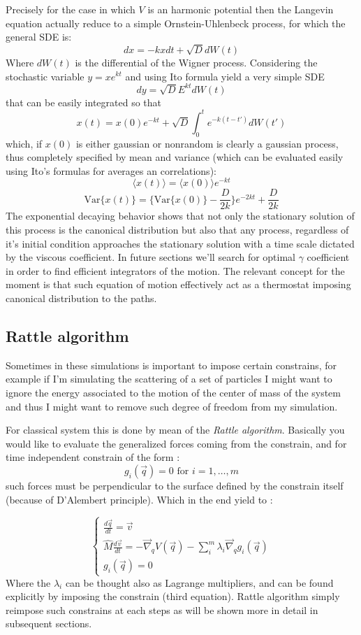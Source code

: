 \documentclass[10pt,a4paper]{article}
\begin{document}
Precisely for the case in which $V$ is an harmonic potential then the Langevin equation actually reduce to a simple Ornstein-Uhlenbeck process, for which the general SDE is:
\[dx = -kxdt+\sqrt{D} dW(t) \] 
Where $dW(t)$ is the differential of the Wigner process.
Considering the stochastic variable $y=xe^{kt}$ and using Ito formula yield a very simple SDE 
\[dy = \sqrt{D} E^{kt} dW(t) \] 
that can be easily integrated so that
\[x(t) = x(0)e^{-kt}+\sqrt{D} \int_0^t e^{-k(t-t')}dW(t') \]
which, if $x(0)$ is either gaussian or nonrandom is clearly a gaussian process, thus completely specified by mean and variance (which can be evaluated easily using Ito's formulas for averages an correlations):
\[\langle x(t)\rangle =  \langle x(0)\rangle e^{-kt} \]
\[ \text{Var} \{x(t) \}= \{\text{Var}\{x(0)\}  -\frac{D}{2k} \}e^{-2kt} +\frac{D}{2k} \]
The exponential decaying behavior shows that not only the stationary solution of this process is the canonical distribution but also that any process, regardless of it's initial condition approaches the stationary solution with a time scale dictated by the viscous coefficient. In future sections we'll search for optimal $\gamma$ coefficient in order to find efficient integrators of the motion.
The relevant concept for the moment is that such equation of motion effectively act as a thermostat imposing canonical distribution to the paths. 

\subsection{Rattle algorithm}

Sometimes in these simulations is important to impose certain constrains, for example if I'm simulating the scattering of a set of particles I might want to ignore the energy associated to the motion of the center of mass of the system and thus I might want to remove such degree of freedom from my simulation. 

For classical system this is done by mean of the \emph{Rattle algorithm}.
Basically you would like to evaluate the generalized forces coming from the constrain, and for time independent constrain of the form :
\[g_i(\vec{q}) = 0  \text{ for } i=1,\dots,m \]
such forces must be perpendicular to the surface defined by the constrain itself (because of D'Alembert principle). Which in the end yield to :

\[
\begin{cases} 
	\frac{d\vec{q}}{dt} = \vec{v} \\ 
	\hat{M} \frac{d\vec{v}}{dt} = - \vec{\nabla}_{q}V(\vec{q})- \sum_i^m \lambda_i  \vec{\nabla}_{q}g_i(\vec{q})\\ 
	g_i(\vec{q})=0
\end{cases}
\]
Where the $\lambda_i$ can be thought also as Lagrange multipliers, and can be found explicitly by imposing the constrain (third equation).
Rattle algorithm simply reimpose such constrains at each steps as will be shown more in detail in subsequent sections.
\end{document}
